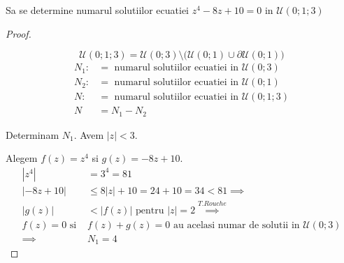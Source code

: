 \begin{aplicatie}
    Sa se determine numarul solutiilor ecuatiei $z^4 -8z + 10 = 0 $ in $\mathcal{U}(0;1;3)$
    \begin{proof}
        \begin{center}
        \end{center}

        \[
            \mathcal{U}(0;1;3) = \mathcal{U}(0;3)\setminus
                \big(\mathcal{U}(0;1) \cup \partial \mathcal{U}(0;1)\big)
        \]
        \begin{align*}
            N_1 :&= \text{ numarul solutiilor ecuatiei in } \mathcal{U}(0;3) \\
            N_2 :&= \text{ numarul solutiilor ecuatiei in } \mathcal{U}(0;1) \\
            N :&= \text{ numarul solutiilor ecuatiei in } \mathcal{U}(0;1;3)  \\
            N &= N_1 - N_2
        \end{align*}

        Determinam $N_1$. Avem $|z| < 3$.

        Alegem $f(z) = z^4$ si $g(z) = -8z + 10$.
        \begin{align*}
            |z^4| &= 3^4 = 81 \\
            |-8z + 10| &\leq 8|z| + 10 = 24 + 10 = 34 < 81 \implies \\
            |g(z)| &< |f(z)| \text{ pentru } |z| = 2 \overset{T.Rouche}{\implies} \\
            f(z) = 0 \text{ si } & f(z) + g(z) = 0 \text{ au acelasi numar de solutii in }
                \mathcal{U}(0;3) \\
            \implies & N_1 = 4
        \end{align*}


\end{proof}
\end{aplicatie}
